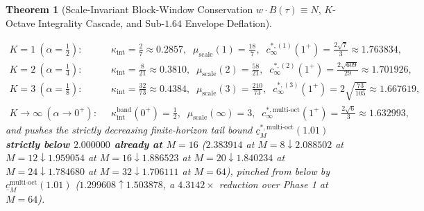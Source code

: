 \documentclass[11pt,reqno]{amsart}
\newtheorem{theorem}{Theorem}[section]
\theoremstyle{definition}
\theoremstyle{remark}
\begin{document}
\begin{theorem}[Scale-Invariant Block-Window Conservation $w \cdot B(\tau) \equiv N$, $K$-Octave Integrality Cascade, and Sub-$1.64$ Envelope Deflation]
\begin{enumerate}
  \begin{equation}\label{eq:c_infty_multioct}
    \begin{aligned}
      K = 1\ (\alpha = \tfrac{1}{2}): &\;\; \kappa_{\mathrm{int}} = \frac{2}{7} \approx 0.2857,\;\; \mu_{\mathrm{scale}}(1) = \frac{18}{7},\;\; c_\infty^{*,(1)}(1^+) = \frac{2\sqrt{7}}{3} \approx 1.763834, \\
      K = 2\ (\alpha = \tfrac{1}{4}): &\;\; \kappa_{\mathrm{int}} = \frac{8}{21} \approx 0.3810,\;\; \mu_{\mathrm{scale}}(2) = \frac{58}{21},\;\; c_\infty^{*,(2)}(1^+) = \frac{2\sqrt{609}}{29} \approx 1.701926, \\
      K = 3\ (\alpha = \tfrac{1}{8}): &\;\; \kappa_{\mathrm{int}} = \frac{32}{73} \approx 0.4384,\;\; \mu_{\mathrm{scale}}(3) = \frac{210}{73},\;\; c_\infty^{*,(3)}(1^+) = 2\sqrt{\frac{73}{105}} \approx 1.667619, \\
      K \to \infty\ (\alpha \to 0^+): &\;\; \kappa_{\mathrm{int}}^{\mathrm{band}}(0^+) = \frac{1}{2},\;\; \mu_{\mathrm{scale}}(\infty) = 3,\;\; c_\infty^{*,\mathrm{multi\text{-}oct}}(1^+) = \frac{2\sqrt{6}}{3} \approx 1.632993,
    \end{aligned}
  \end{equation}
  and pushes the strictly decreasing finite-horizon tail bound $\underline{c}_M^{*,\mathrm{multi\text{-}oct}}(1.01)$ \textbf{strictly below $2.000000$ already at $M = 16$} ($2.383914$ at $M=8 \downarrow 2.088502$ at $M=12 \downarrow \mathbf{1.959054}$ at $M=16 \downarrow 1.886523$ at $M=20 \downarrow 1.840234$ at $M=24 \downarrow \mathbf{1.784680}$ at $M=32 \downarrow \mathbf{1.706111}$ at $M=64$), pinched from below by $\underline{c}_M^{\mathrm{multi\text{-}oct}}(1.01)$ ($1.299608 \uparrow 1.503878$, a $4.3142\times$ reduction over Phase 1 at $M=64$).
\end{enumerate}
\end{theorem}
\end{document}
